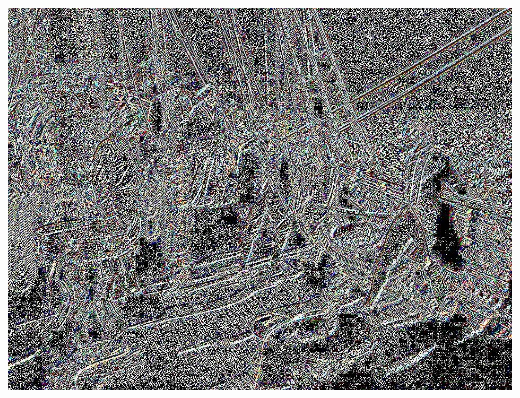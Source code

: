 \documentclass[a4paper,12pt]{article}
\begin{document}
\begin{center}
\includegraphics[width=0.8\linewidth,height=0.7\textheight]{preconditioning/test_PAETH}
\end{center}
\newpage
\end{document}
